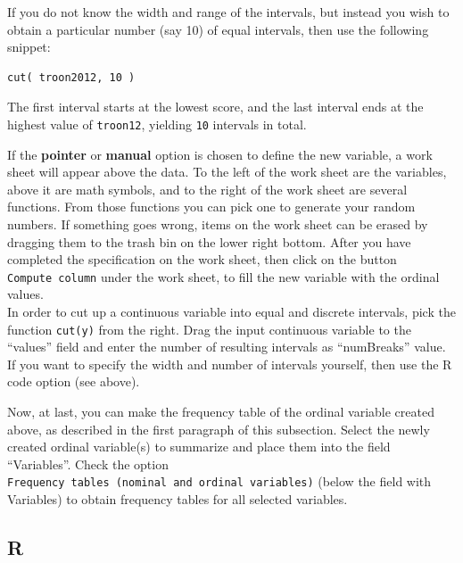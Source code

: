 \documentclass[
]{book}
\newenvironment{Shaded}{\begin{snugshade}}{\end{snugshade}}
\newcommand{\AttributeTok}[1]{\textcolor[rgb]{0.77,0.63,0.00}{#1}}
\newcommand{\ConstantTok}[1]{\textcolor[rgb]{0.00,0.00,0.00}{#1}}
\newcommand{\FunctionTok}[1]{\textcolor[rgb]{0.00,0.00,0.00}{#1}}
\newcommand{\NormalTok}[1]{#1}
\newcommand{\OtherTok}[1]{\textcolor[rgb]{0.56,0.35,0.01}{#1}}
\newcommand{\SpecialCharTok}[1]{\textcolor[rgb]{0.00,0.00,0.00}{#1}}
\newcommand{\StringTok}[1]{\textcolor[rgb]{0.31,0.60,0.02}{#1}}
\begin{document}
If you do not know the width and range of the intervals, but instead you wish to obtain a particular number (say 10) of equal intervals, then use the following snippet:

\begin{verbatim}
cut( troon2012, 10 ) 
\end{verbatim}

The first interval starts at the lowest score, and the last interval ends at the highest value of \texttt{troon12}, yielding \texttt{10} intervals in total.

If the \textbf{pointer} or \textbf{manual} option is chosen to define the new variable, a work sheet will appear above the data. To the left of the work sheet are the variables, above it are math symbols, and to the right of the work sheet are several functions. From those functions you can pick one to generate your random numbers. If something goes wrong, items on the work sheet can be erased by dragging them to the trash bin on the lower right bottom. After you have completed the specification on the work sheet, then click on the button \texttt{Compute\ column} under the work sheet, to fill the new variable with the ordinal values.\\
In order to cut up a continuous variable into equal and discrete intervals, pick the function \texttt{cut(y)} from the right. Drag the input continuous variable to the ``values'' field and enter the number of resulting intervals as ``numBreaks'' value. If you want to specify the width and number of intervals yourself, then use the R code option (see above).

Now, at last, you can make the frequency table of the ordinal variable created above, as described in the first paragraph of this subsection. Select the newly created ordinal variable(s) to summarize and place them into the field ``Variables''. Check the option \texttt{Frequency\ tables\ (nominal\ and\ ordinal\ variables)} (below the field with Variables) to obtain frequency tables for all selected variables.

\hypertarget{r-1}{%
\subsection{R}\label{r-1}}

\begin{Shaded}
\end{Shaded}
\end{document}
